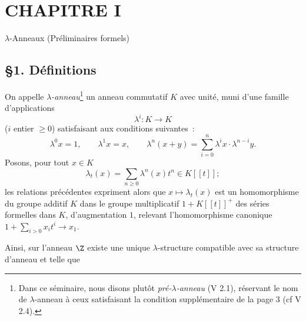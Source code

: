 \section*{CHAPITRE I}
\begin{center}
$\lambda$-Anneaux (Préliminaires formels)
\end{center}

\subsection*{\S 1. Définitions}

On appelle \emph{$\lambda$-anneau}\footnote{Dans ce séminaire, nous disons plutôt \emph{pré-$\lambda$-anneau} (V 2.1), réservant le nom de $\lambda$-anneau à ceux satisfaisant la condition supplémentaire de la page 3 (cf V 2.4).} un anneau commutatif $K$ avec unité, muni d'une famille d'applications
\begin{equation}\tag{1.1}
\lambda^i:K\longrightarrow K
\end{equation}
($i$ entier $\geq 0$) satisfaisant aux conditions suivantes~:
\begin{equation}\tag{1.2}
\lambda^0x=1,\qquad \lambda^1x=x,\qquad
\lambda^n(x+y)=\sum_{i=0}^n\lambda^ix\cdot\lambda^{n-i}y.
\end{equation}
Posons, pour tout $x\in K$
\begin{equation}\tag{1.3}
\lambda_t(x)=\sum_{n\geq 0}\lambda^n(x)t^n\in K[[t]] ;
\end{equation}
les relations précédentes expriment alors que $x\longmapsto\lambda_t(x)$ est un homomorphisme du groupe additif $K$ dans le groupe multiplicatif $1+K[[t]]^+$ des séries formelles dans $K$, d'augmentation $1$, relevant l'homomorphisme canonique $1+\sum_{i>0}x_it^i\longrightarrow x_1$.

Ainsi, sur l'anneau $\Z$ existe une unique $\lambda$-structure compatible avec sa structure d'anneau et telle que
